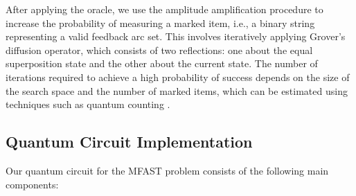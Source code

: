 After applying the oracle, we use the amplitude amplification procedure to increase the probability of measuring a marked item, i.e., a binary string representing a valid feedback arc set. This involves iteratively applying Grover's diffusion operator, which consists of two reflections: one about the equal superposition state and the other about the current state. The number of iterations required to achieve a high probability of success depends on the size of the search space and the number of marked items, which can be estimated using techniques such as quantum counting \cite{brassard1998quantum}.

\subsection{Quantum Circuit Implementation}

Our quantum circuit for the MFAST problem consists of the following main components:

